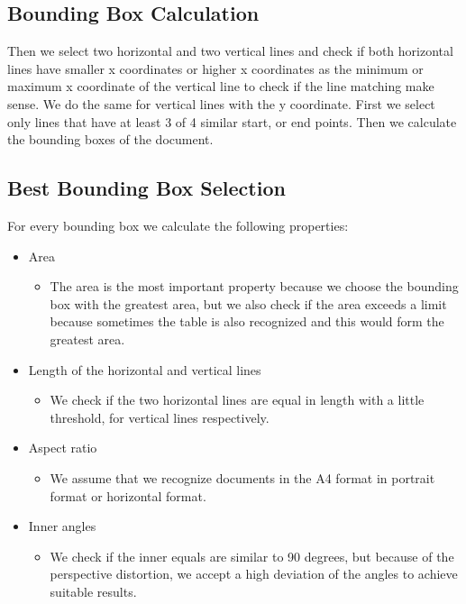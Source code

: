 \documentclass[english, paper=a4]{scrartcl}
\begin{document}
\subsection{Bounding Box Calculation}
Then we select two horizontal and two vertical lines and check if both horizontal lines have smaller x coordinates or higher x coordinates as the minimum or maximum x coordinate of the vertical line to check if the line matching make sense. We do the same for vertical lines with the y coordinate. First we select only lines that have at least 3 of 4 similar start, or end points. Then we calculate the bounding boxes of the document.

\subsection{Best Bounding Box Selection}
For every bounding box we calculate the following properties:
\begin{itemize}
\item Area
\begin{itemize}
\item The area is the most important property because we choose the bounding box with the greatest area, but we also check if the area exceeds a limit because sometimes the table is also recognized and this would form the greatest area. 
\end{itemize}
\item Length of the horizontal and vertical lines
\begin{itemize}
\item We check if the two horizontal lines are equal in length with a little threshold, for vertical lines respectively. 
\end{itemize}
\item Aspect ratio
\begin{itemize}
\item We assume that we recognize documents in the A4 format in portrait format or horizontal format.
\end{itemize}
\item Inner angles
\begin{itemize}
\item We check if the inner equals are similar to 90 degrees, but because of the perspective distortion, we accept a high deviation of the angles to achieve suitable results.
\end{itemize}
\end{itemize}
\end{document}
